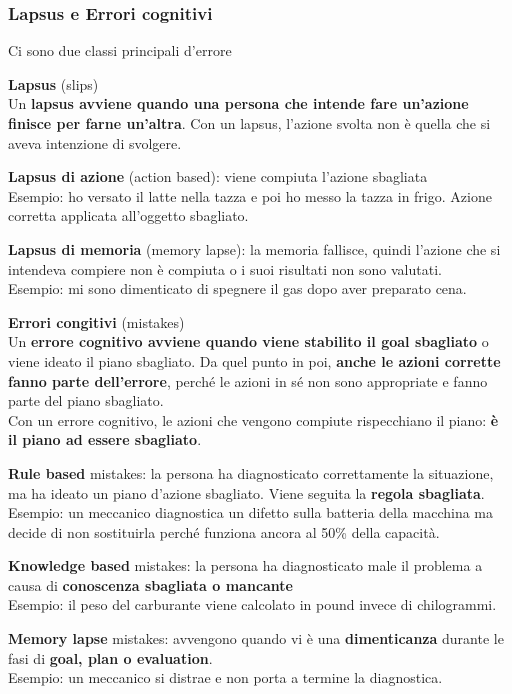 \documentclass[10pt]{article}
\begin{document}
\subsubsection{Lapsus e Errori cognitivi}
Ci sono due classi principali d'errore
\begin{list}{}{}
\item \textbf{Lapsus} (slips)\\
Un \textbf{lapsus avviene quando una persona che intende fare un'azione finisce per farne un'altra}. Con un lapsus, l'azione svolta non è quella che si aveva intenzione di svolgere.
\begin{list}{}{}
\item \textbf{Lapsus di azione} (action based): viene compiuta l'azione sbagliata\\
Esempio: ho versato il latte nella tazza e poi ho messo la tazza in frigo. Azione corretta applicata all'oggetto sbagliato.
\item \textbf{Lapsus di memoria} (memory lapse): la memoria fallisce, quindi l'azione che si intendeva compiere non è compiuta o i suoi risultati non sono valutati.\\
Esempio: mi sono dimenticato di spegnere il gas dopo aver preparato cena.
\end{list}
\pagebreak
\item \textbf{Errori congitivi} (mistakes)\\
Un \textbf{errore cognitivo avviene quando viene stabilito il goal sbagliato} o viene ideato il piano sbagliato. Da quel punto in poi, \textbf{anche le azioni corrette fanno parte dell'errore}, perché le azioni in sé non sono appropriate e fanno parte del piano sbagliato.\\
Con un errore cognitivo, le azioni che vengono compiute rispecchiano il piano: \textbf{è il piano ad essere sbagliato}.
\begin{list}{}{}
\item \textbf{Rule based} mistakes: la persona ha diagnosticato correttamente la situazione, ma ha ideato un piano d'azione sbagliato. Viene seguita la \textbf{regola sbagliata}.\\
Esempio: un meccanico diagnostica un difetto sulla batteria della macchina ma decide di non sostituirla perché funziona ancora al 50\% della capacità.
\item \textbf{Knowledge based} mistakes: la persona ha diagnosticato male il problema a causa di \textbf{conoscenza sbagliata o mancante}\\
Esempio: il peso del carburante viene calcolato in pound invece di chilogrammi.
\item \textbf{Memory lapse} mistakes: avvengono quando vi è una \textbf{dimenticanza} durante le fasi di \textbf{goal, plan o evaluation}.\\
Esempio: un meccanico si distrae e non porta a termine la diagnostica.
\end{list}
\end{list}
\end{document}
